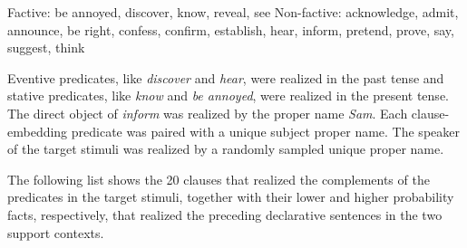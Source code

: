 \documentclass[11pt,fleqn]{article}
\newcommand{\6}{\mbox{$[\hspace*{-.6mm}[$}}
\newcommand{\9}{\mbox{$]\hspace*{-.6mm}]$}}
\begin{document}
\begin{exe}
\ex\label{predicates}
\begin{xlist}
\ex Factive: be annoyed, discover, know, reveal, see
\ex Non-factive: acknowledge, admit, announce, be right, confess, confirm, establish, hear, inform, pretend, prove, say, suggest, think
\end{xlist}
\end{exe}
Eventive predicates, like {\em discover} and {\em hear}, were realized in the past tense and stative predicates, like {\em know} and {\em be annoyed}, were realized in the present tense. The direct object of {\em inform} was realized by the proper name {\em Sam}. Each clause-embedding predicate was paired with a unique subject proper name. The speaker of the target stimuli was realized by a randomly sampled unique proper name. 

The following list shows the 20 clauses that realized the complements of the predicates in the target stimuli, together with their lower and higher probability facts, respectively, that realized the preceding declarative sentences in the two support contexts.
\end{document}
